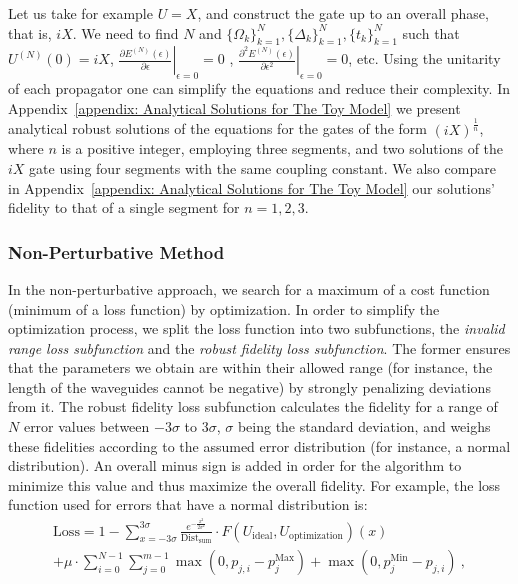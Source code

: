 \documentclass[floatfix,reprint, amsmath,amssymb,aps,superscriptaddress,nofootinbib]{revtex4-2}
\begin{document}
Let us take for example $U=X$, and construct the gate up to an overall phase, that is, $iX$.
We need
to find 
$N$ and $\{ \Omega_k \}_{k=1}^{N},\{ \Delta_k \}_{k=1}^{N} ,\{ t_k \}_{k=1}^{N}$ such that $U^{\left(N\right)}\left(0\right)=iX$, $ \left. \frac{\partial E^{\left(N\right)}\left(\epsilon\right)}{\partial \epsilon}\right| _{\epsilon=0}=0$ , $ \left. \frac{\partial ^2 E^{\left(N\right)}\left(\epsilon\right)}{\partial \epsilon ^2}\right| _{\epsilon=0}=0$, etc. Using the unitarity of each propagator one can simplify the equations and reduce their complexity.
In Appendix~\ref{appendix: Analytical Solutions for The Toy Model} we present analytical robust solutions of the equations
for the gates of the form ${\left(iX\right)}^{\frac{1}{n}}$, where $n$ is a positive integer, employing three segments, and two solutions of the $iX$ gate using four segments with the same coupling constant.
We also compare in Appendix~\ref{appendix: Analytical Solutions for The Toy Model} our solutions' fidelity to that of a single segment for $n=1,2,3$.

\subsubsection{Non-Perturbative Method}

In the non-perturbative approach, we search for a maximum of a cost function (minimum of a loss function) by optimization. In order to simplify the optimization process, we split the loss function into two subfunctions, the \emph{invalid range loss subfunction} and the \emph{robust fidelity loss subfunction}. The former ensures that the parameters we obtain are within their allowed range (for instance, the length of the waveguides cannot be negative) by strongly penalizing deviations from it.
The robust fidelity loss subfunction calculates the fidelity for a range of $N$ error values between $-3\sigma$ to $3\sigma$, $\sigma$ being the standard deviation, and weighs these fidelities according to the assumed error distribution (for instance, a normal distribution). %
An overall minus sign is added in order for the algorithm to minimize this value and thus maximize the overall fidelity. For example, the loss function used for errors that have a normal distribution is:
\begin{equation}
    \begin{split}
        \mathrm{Loss} = 1 - \sum_{x=-3 \sigma }^{3 \sigma } \frac{e^{-\frac{x^2}{2 \sigma^2}}}{\mathrm{Dist}_\mathrm{sum}}  \cdot F(U_\mathrm{ideal},U_\mathrm{optimization})(x)  \\ + \mu \cdot \sum_{i=0}^{N-1}  \sum_{j=0}^{m-1} \max(0, p_{j,i} - p_{j}^{\mathrm{Max}}) + \max(0, p_{j}^{\mathrm{Min}} - p_{j,i}) \ ,
    \end{split}
\end{equation}
\end{document}
